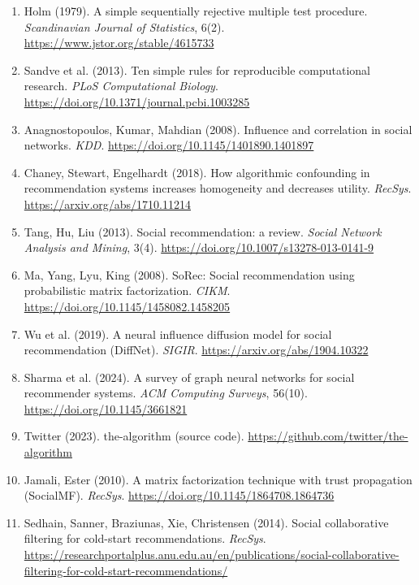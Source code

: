 {\begin{enumerate}[leftmargin=*, label=\arabic*., ref=\arabic*, itemsep=0.8em]
  \item\label{ref:holm1979} Holm (1979). A simple sequentially rejective multiple test procedure. \textit{Scandinavian Journal of Statistics}, 6(2). \url{https://www.jstor.org/stable/4615733} %
  \item\label{ref:sandve2013} Sandve et al. (2013). Ten simple rules for reproducible computational research. \textit{PLoS Computational Biology}. \url{https://doi.org/10.1371/journal.pcbi.1003285} %
  \item\label{ref:anagnostopoulos2008} Anagnostopoulos, Kumar, Mahdian (2008). Influence and correlation in social networks. \textit{KDD}. \url{https://doi.org/10.1145/1401890.1401897} %
  \item\label{ref:chaney2018} Chaney, Stewart, Engelhardt (2018). How algorithmic confounding in recommendation systems increases homogeneity and decreases utility. \textit{RecSys}. \url{https://arxiv.org/abs/1710.11214} %
  \item\label{ref:tang2013} Tang, Hu, Liu (2013). Social recommendation: a review. \textit{Social Network Analysis and Mining}, 3(4). \url{https://doi.org/10.1007/s13278-013-0141-9} %
  \item\label{ref:ma2008} Ma, Yang, Lyu, King (2008). SoRec: Social recommendation using probabilistic matrix factorization. \textit{CIKM}. \url{https://doi.org/10.1145/1458082.1458205} %
  \item\label{ref:wu2019} Wu et al. (2019). A neural influence diffusion model for social recommendation (DiffNet). \textit{SIGIR}. \url{https://arxiv.org/abs/1904.10322} %
  \item\label{ref:sharma2024} Sharma et al. (2024). A survey of graph neural networks for social recommender systems. \textit{ACM Computing Surveys}, 56(10). \url{https://doi.org/10.1145/3661821} %
  \item\label{ref:twitter-code2023} Twitter (2023). the-algorithm (source code). \url{https://github.com/twitter/the-algorithm} %
  \item\label{ref:jamali2010} Jamali, Ester (2010). A matrix factorization technique with trust propagation (SocialMF). \textit{RecSys}. \url{https://doi.org/10.1145/1864708.1864736} %
  \item\label{ref:sedhain2014} Sedhain, Sanner, Braziunas, Xie, Christensen (2014). Social collaborative filtering for cold-start recommendations. \textit{RecSys}. \url{https://researchportalplus.anu.edu.au/en/publications/social-collaborative-filtering-for-cold-start-recommendations/}{\raggedright\par} %

\end{enumerate}}
